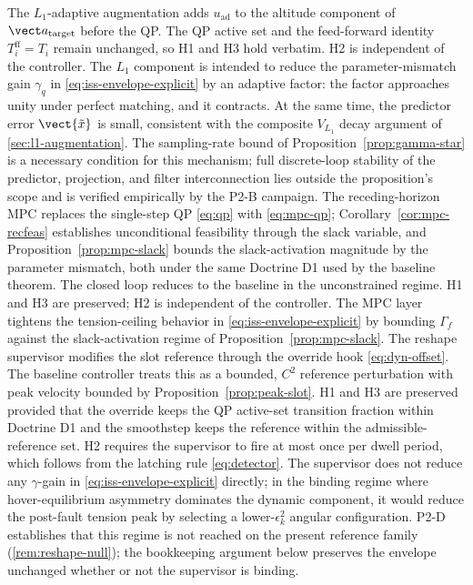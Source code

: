 The $L_1$-adaptive augmentation adds $u_{\mathrm{ad}}$ to the altitude component of $\vect a_{\mathrm{target}}$ before the QP. The QP active set and the feed-forward identity $T_i^{\mathrm{ff}} = T_i$ remain unchanged, so H1 and H3 hold verbatim. H2 is independent of the controller. The $L_1$ component is intended to reduce the parameter-mismatch gain $\gamma_q$ in \eqref{eq:iss-envelope-explicit} by an adaptive factor: the factor approaches unity under perfect matching, and it contracts. At the same time, the predictor error $\vect{\tilde x}$ is small, consistent with the composite $V_{L_1}$ decay argument of \cref{sec:l1-augmentation}. The sampling-rate bound of Proposition~\ref{prop:gamma-star} is a necessary condition for this mechanism; full discrete-loop stability of the predictor, projection, and filter interconnection lies outside the proposition's scope and is verified empirically by the P2-B campaign. The receding-horizon MPC replaces the single-step QP \eqref{eq:qp} with \eqref{eq:mpc-qp}; Corollary~\ref{cor:mpc-recfeas} establishes unconditional feasibility through the slack variable, and Proposition~\ref{prop:mpc-slack} bounds the slack-activation magnitude by the parameter mismatch, both under the same Doctrine D1 used by the baseline theorem. The closed loop reduces to the baseline in the unconstrained regime. H1 and H3 are preserved; H2 is independent of the controller. The MPC layer tightens the tension-ceiling behavior in \eqref{eq:iss-envelope-explicit} by bounding $\Gamma_f$ against the slack-activation regime of Proposition~\ref{prop:mpc-slack}. The reshape supervisor modifies the slot reference through the override hook \eqref{eq:dyn-offset}. The baseline controller treats this as a bounded, $C^2$ reference perturbation with peak velocity bounded by Proposition~\ref{prop:peak-slot}. H1 and H3 are preserved provided that the override keeps the QP active-set transition fraction within Doctrine D1 and the smoothstep keeps the reference within the admissible-reference set. H2 requires the supervisor to fire at most once per dwell period, which follows from the latching rule \eqref{eq:detector}. The supervisor does not reduce any $\gamma$-gain in \eqref{eq:iss-envelope-explicit} directly; in the binding regime where hover-equilibrium asymmetry dominates the dynamic component, it would reduce the post-fault tension peak by selecting a lower-$\epsilon_k^2$ angular configuration. P2-D establishes that this regime is not reached on the present reference family (\cref{rem:reshape-null}); the bookkeeping argument below preserves the envelope unchanged whether or not the supervisor is binding.

